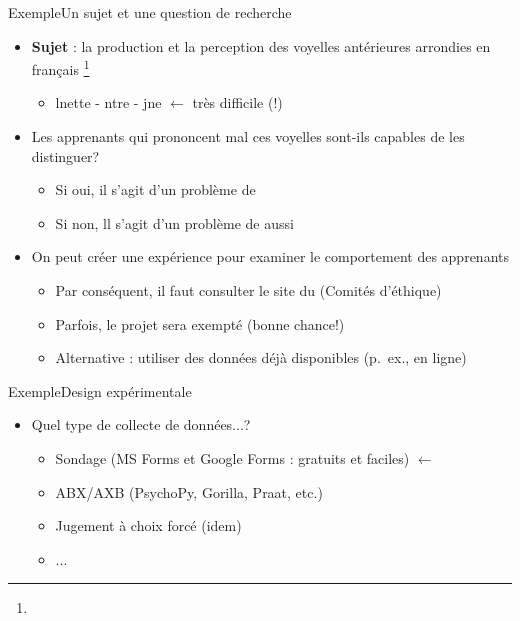 \documentclass[xcolor=dvipsnames, mathserif, 10pt, aspectratio=169, handout]{beamer}
\begin{document}
\begin{frame}{Exemple}{Un sujet et une question de recherche}

\begin{itemize}
	\item[1.] \textbf{Sujet} : la production et la perception des voyelles antérieures arrondies en français \footnote{}

\pause

	\begin{itemize}
		\item lnette - ntre - jne $\leftarrow$ très difficile (!)
	\end{itemize}

\pause

	\item[2.] Les apprenants qui prononcent mal ces voyelles sont-ils capables de les distinguer?%
	\begin{itemize}
		\item Si oui, il s'agit d'un problème de 
		\item Si non, ll s'agit d'un problème de  aussi
	\end{itemize} 
\pause

	\item[3.] On peut créer une expérience pour examiner le comportement des apprenants 
	\begin{itemize}
		\item Par conséquent, il faut consulter le site du  (Comités d'éthique)
		\item Parfois, le projet sera exempté (bonne chance!)
		\item Alternative : utiliser des données déjà disponibles (p.\ ex., en ligne)
	\end{itemize}
\end{itemize}
	
\end{frame}


\begin{frame}{Exemple}{Design expérimentale}

\begin{itemize}
	\item Quel type de collecte de données...?
	\begin{itemize}
		
		\item Sondage (MS Forms et Google Forms : gratuits et faciles) $\leftarrow$ 
	\pause
		\item ABX/AXB (PsychoPy, Gorilla, Praat, etc.)
	\pause
		\item Jugement à choix forcé (idem)
		\item ... 
		
	\end{itemize}
\end{itemize}

\end{frame}
\end{document}
